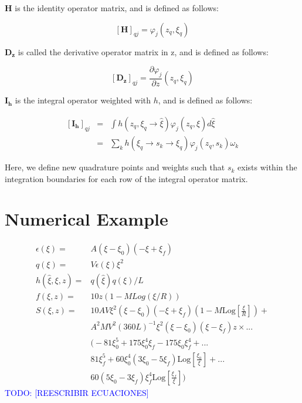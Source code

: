 \documentclass{CFD2011}
\newcommand{\TODO}[1]{\textcolor{blue}{TODO: #1} \\}
\begin{document}
$\mathbf{H}$ is the identity operator matrix, and is defined as follows:

\begin{equation}
\left[\mathbf{H}\right]_{qj}=\varphi_j(z_q,\xi_q)
\end{equation}

$\mathbf{D_z}$ is called the derivative operator matrix in z, and is defined as follows:

\begin{equation}
\left[\mathbf{D_z}\right]_{qj}=\frac{\partial \varphi_j}{\partial z}(z_q,\xi_q)
\end{equation}

$\mathbf{I_h}$ is the integral operator weighted with $h$, and is defined as follows:

\begin{eqnarray}
\left[\mathbf{I_h}\right]_{qj}&=&\int h(z_q,\xi_q\rightarrow\hat{\xi})\varphi_j(z_q,\hat{\xi}) d\hat{\xi}\nonumber \\
&=&\sum_k h(\xi_q\rightarrow s_k \rightarrow\xi_q)\varphi_j(z_q,s_k) \omega_k
\end{eqnarray}

Here, we define new quadrature points and weights such that $s_k$ exists within the integration boundaries for each row of the integral operator matrix.

\section{Numerical Example}

\begin{align}
\epsilon(\xi)=&A (\xi-\xi_0) (-\xi+\xi_f) \\
q({\xi}) =&V \epsilon(\xi) \xi^2\\
h(\hat \xi, \xi, z) =& q(\hat \xi) q(\xi)/L\\
f(\xi, z) =& 10 z (1-M Log({\xi}/R))\\
\nonumber S(\xi, z)=& 10 A V {\xi}^2 ({\xi}-\xi_0) (-{\xi}+\xi_f) \left(1-M \text{Log}\left[\frac{{\xi}}{R}\right]\right) +\\
\nonumber  &A^2 M V^2  (360 L)^{-1} {\xi}^2 ({\xi}-\xi_0) ({\xi}-\xi_f) z \times ... \\
\nonumber  &\big(-81 \xi_0^5+175 \xi_0^4 \xi_f-175 \xi_0 \xi_f^4+  ...\\
\nonumber &81 \xi_f^5+60 \xi_0^4 (3 \xi_0-5 \xi_f) \text{Log}\left[\frac{\xi_0}{{\xi}}\right]+ ...\\
& 60 (5 \xi_0-3 \xi_f) \xi_f^4 \text{Log}\left[\frac{\xi_f}{{\xi}}\right]\big)
\end{align}
\TODO{[REESCRIBIR ECUACIONES]}
\end{document}
